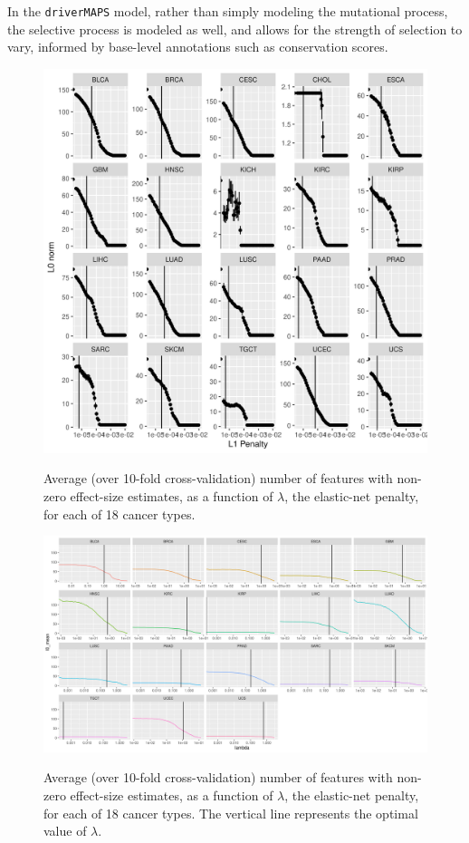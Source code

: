 In the \texttt{driverMAPS} model, rather than simply modeling the mutational process, the selective process is modeled as well, and allows for the strength of selection to vary, informed by base-level annotations such as conservation scores.  

\begin{figure}
    \centering
    \includegraphics[width=.9\linewidth]{img/cv_l0.png}
    \label{fig:cv_l0}
    \caption{Average (over 10-fold cross-validation) number of features with non-zero effect-size estimates, as a function of $\lambda$, the elastic-net penalty, for each of 18 cancer types.}
\end{figure}



\begin{figure}
    \centering
    \includegraphics[width=.9\linewidth]{img/enet_cv_l0.png}
    \label{fig:enet_cv_l0}
    \caption{Average (over 10-fold cross-validation) number of features with non-zero effect-size estimates, as a function of $\lambda$, the elastic-net penalty, for each of 18 cancer types.  The vertical line
    represents the optimal value of $\lambda$.}
\end{figure}

 
 

% 

